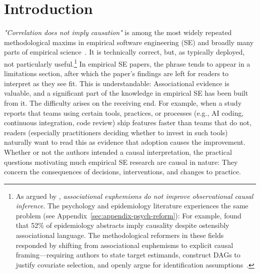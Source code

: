 \section{Introduction}
\label{sec:introduction}

\emph{"Correlation does not imply causation"} is among the most widely repeated methodological maxims in empirical software engineering (SE) and broadly many parts of empirical science~\cite{hernan2018cword, haber2022causal}. 
It is technically correct, but, as typically deployed, not particularly useful.\footnote{
  As argued by \citet{hernan2018cword}, \emph{associational euphemisms do not improve observational causal inference}.
  The psychology and epidemiology literature experiences the same problem (see Appendix~\ref{sec:appendix-psych-reform}): For example, \citet{haber2022causal} found that 52\% of epidemiology abstracts imply causality despite ostensibly associational language.
  The methodological reformers in these fields responded by shifting from associational euphemisms to explicit causal framing---requiring authors to state target estimands, construct DAGs to justify covariate selection, and openly argue for identification assumptions~\cite{grosz2020taboo, lundberg2021estimand, rohrer2018thinking, rohrer2024causal}.
}
In empirical SE papers, the phrase tends to appear in a limitations section, after which the paper's findings are left for readers to interpret as they see fit.
This is understandable: Associational evidence is valuable, and a significant part of the knowledge in empirical SE has been built from it. 
The difficulty arises on the receiving end. 
For example, when a study reports that teams using certain tools, practices, or processes (e.g., AI coding, continuous integration, code review) ship features faster than teams that do not, readers (especially practitioners deciding whether to invest in such tools) naturally want to read this as evidence that adoption causes the improvement.
Whether or not the authors intended a causal interpretation, the practical questions motivating much empirical SE research are causal in nature: They concern the consequences of decisions, interventions, and changes to practice.

